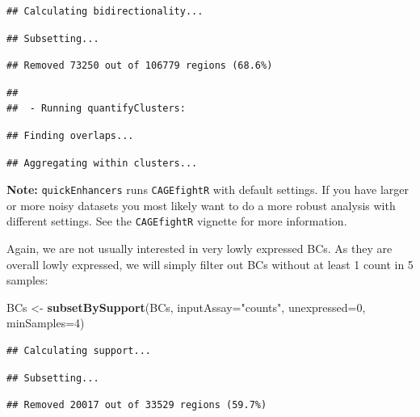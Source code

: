 \documentclass[9pt,a4paper,]{extarticle}
\newenvironment{Shaded}{\begin{snugshade}}{\end{snugshade}}
\newcommand{\KeywordTok}[1]{\textcolor[rgb]{0.13,0.29,0.53}{\textbf{{#1}}}}
\newcommand{\DataTypeTok}[1]{\textcolor[rgb]{0.13,0.29,0.53}{{#1}}}
\newcommand{\DecValTok}[1]{\textcolor[rgb]{0.00,0.00,0.81}{{#1}}}
\newcommand{\StringTok}[1]{\textcolor[rgb]{0.31,0.60,0.02}{{#1}}}
\newcommand{\NormalTok}[1]{{#1}}
\begin{document}
\begin{verbatim}
## Calculating bidirectionality...
\end{verbatim}

\begin{verbatim}
## Subsetting...
\end{verbatim}

\begin{verbatim}
## Removed 73250 out of 106779 regions (68.6%)
\end{verbatim}

\begin{verbatim}
## 
##  - Running quantifyClusters:
\end{verbatim}

\begin{verbatim}
## Finding overlaps...
\end{verbatim}

\begin{verbatim}
## Aggregating within clusters...
\end{verbatim}

\textbf{Note:} \texttt{quickEnhancers} runs \texttt{CAGEfightR} with default settings. If you have larger or more noisy datasets you most likely want to do a more robust analysis with different settings. See the \texttt{CAGEfightR} vignette for more information.

Again, we are not usually interested in very lowly expressed BCs. As they are overall lowly expressed, we will simply filter out BCs without at least 1 count in 5 samples:

\begin{Shaded}
\begin{Highlighting}[]
\NormalTok{BCs <-}\StringTok{ }\KeywordTok{subsetBySupport}\NormalTok{(BCs, }\DataTypeTok{inputAssay=}\StringTok{"counts"}\NormalTok{, }\DataTypeTok{unexpressed=}\DecValTok{0}\NormalTok{, }\DataTypeTok{minSamples=}\DecValTok{4}\NormalTok{)}
\end{Highlighting}
\end{Shaded}

\begin{verbatim}
## Calculating support...
\end{verbatim}

\begin{verbatim}
## Subsetting...
\end{verbatim}

\begin{verbatim}
## Removed 20017 out of 33529 regions (59.7%)
\end{verbatim}
\end{document}
